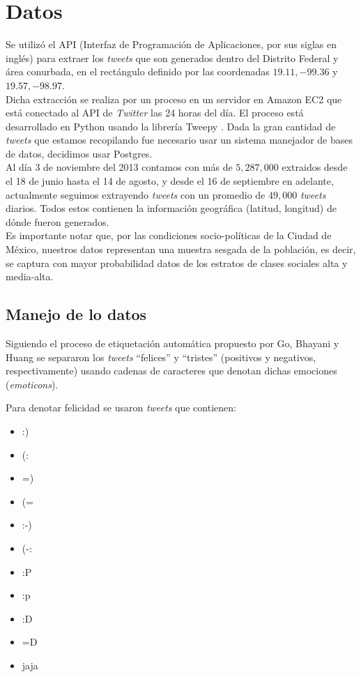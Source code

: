 \documentclass{article}
\begin{document}
\section{Datos}
	Se utilizó el API (Interfaz de Programación de Aplicaciones, por sus siglas en inglés) para extraer los \emph{tweets} que son generados dentro del Distrito Federal y área conurbada, en el rectángulo definido por las coordenadas $19.11,-99.36$ y $19.57,-98.97$.\\[.3cm]
%		
Dicha extracción se realiza por un proceso en un servidor en Amazon EC2 que está conectado al API de \emph{Twitter} las 24 horas del día. El proceso está desarrollado en Python usando la librería Tweepy \cite{tweepy}. Dada la gran cantidad de \emph{tweets} que estamos recopilando fue necesario usar un sistema manejador de bases de datos, decidimos usar Postgres.\\[.3cm]
%
Al día 3 de noviembre del 2013 contamos con más de $5,287,000$ extraidos desde el 18 de junio hasta el 14 de agosto, y desde el 16 de septiembre en adelante, actualmente seguimos extrayendo \emph{tweets} con un promedio de $49,000$ \emph{tweets} diarios. Todos estos contienen la información geográfica (latitud, longitud) de dónde fueron generados.\\[.3cm]
%
Es importante notar que, por las condiciones socio-políticas de la Ciudad de México, nuestros datos representan una muestra sesgada de la población, es decir, se captura con mayor probabilidad datos de los estratos de clases sociales alta y media-alta. 

\subsection{Manejo de lo datos}
	    Siguiendo el proceso de etiquetación automática propuesto por Go, Bhayani y Huang \cite{Go} se separaron los \emph{tweets} ``felices''  y ``tristes'' (positivos y negativos, respectivamente) usando cadenas de caracteres que denotan dichas emociones (\emph{emoticons}).
	    
	    \noindent Para denotar felicidad se usaron \emph{tweets} que contienen:
	\begin{multicols}{3}
	\begin{itemize}
        \item :)
        \item (:
        \item =) 
        \item (=
        \item :-)
        \item (-:
        \item :P
        \item :p
        \item :D
        \item =D
        \item jaja
    \end{itemize}
    \end{multicols}
    
\end{document}
